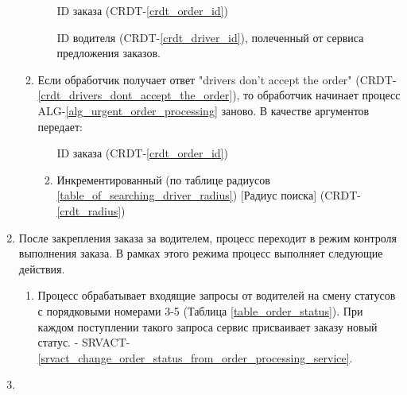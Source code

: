 \begin{alg}
\begin{enumerate}
\begin{enumerate}
           			\begin{enumerate}
             			\item [ID заказа] (CRDT-\ref{crdt_order_id})
     					    \item [ID водителя] (CRDT-\ref{crdt_driver_id}), полеченный от сервиса предложения заказов.
             		\end{enumerate}

         			\item Если обработчик получает ответ "drivers don't accept the order" (CRDT-\ref{crdt_drivers_dont_accept_the_order}), то обработчик начинает процесс ALG-\ref{alg_urgent_order_processing} заново. В качестве аргументов передает: 

           			\begin{enumerate}
             			\item [ID заказа] (CRDT-\ref{crdt_order_id})
             			\item Инкрементированный (по таблице радиусов \ref{table_of_searching_driver_radius}) [Радиус поиска] (CRDT-\ref{crdt_radius})
           			\end{enumerate}
           			
         		\end{enumerate}

          \item После закрепления заказа за водителем, процесс переходит в режим контроля выполнения заказа. В рамках этого режима процесс выполняет следующие действия.

            \begin{enumerate}
              \item Процесс обрабатывает входящие запросы от водителей на смену статусов с порядковыми номерами 3-5 (Таблица \ref{table_order_status}). При каждом поступлении такого запроса сервис присваивает заказу новый статус. - SRVACT-\ref{srvact_change_order_status_from_order_processing_service}.
            \end{enumerate}

          \item 

      	\end{enumerate}

      \end{alg}

